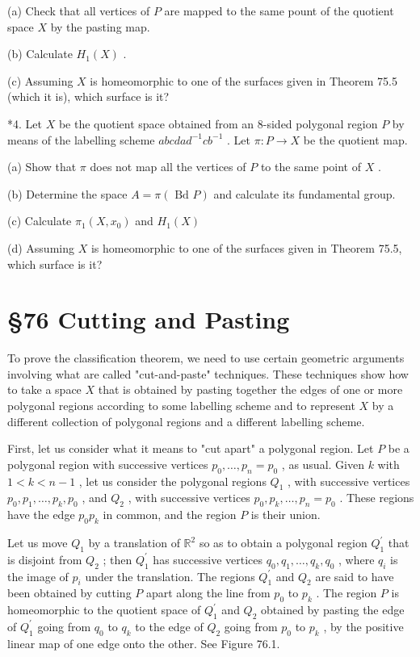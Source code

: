 (a) Check that all vertices of \(P\) are mapped to the same pount of the quotient space \(X\) by the pasting map.

(b) Calculate \({H}_{1}\left( X\right)\) .

(c) Assuming \(X\) is homeomorphic to one of the surfaces given in Theorem 75.5 (which it is), which surface is it?

*4. Let \(X\) be the quotient space obtained from an 8-sided polygonal region \(P\) by means of the labelling scheme \({abcda}{d}^{-1}c{b}^{-1}\) . Let \(\pi  : P \rightarrow  X\) be the quotient map.

(a) Show that \(\pi\) does not map all the vertices of \(P\) to the same point of \(X\) .

(b) Determine the space \(A = \pi \left( {\text{ Bd }P}\right)\) and calculate its fundamental group.

(c) Calculate \({\pi }_{1}\left( {X,{x}_{0}}\right)\) and \({H}_{1}\left( X\right)\)

(d) Assuming \(X\) is homeomorphic to one of the surfaces given in Theorem 75.5, which surface is it?

\section*{ \S 76 Cutting and Pasting}

To prove the classification theorem, we need to use certain geometric arguments involving what are called "cut-and-paste" techniques. These techniques show how to take a space \(X\) that is obtained by pasting together the edges of one or more polygonal regions according to some labelling scheme and to represent \(X\) by a different collection of polygonal regions and a different labelling scheme.

First, let us consider what it means to "cut apart" a polygonal region. Let \(P\) be a polygonal region with successive vertices \({p}_{0},\ldots ,{p}_{n} = {p}_{0}\) , as usual. Given \(k\) with \(1 < k < n - 1\) , let us consider the polygonal regions \({Q}_{1}\) , with successive vertices \({p}_{0},{p}_{1},\ldots ,{p}_{k},{p}_{0}\) , and \({Q}_{2}\) , with successive vertices \({p}_{0},{p}_{k},\ldots ,{p}_{n} = {p}_{0}\) . These regions have the edge \({p}_{0}{p}_{k}\) in common, and the region \(P\) is their union.

Let us move \({Q}_{1}\) by a translation of \({\mathbb{R}}^{2}\) so as to obtain a polygonal region \({Q}_{1}^{\prime }\) that is disjoint from \({Q}_{2}\) ; then \({Q}_{1}^{\prime }\) has successive vertices \({q}_{0},{q}_{1},\ldots ,{q}_{k},{q}_{0}\) , where \({q}_{i}\) is the image of \({p}_{i}\) under the translation. The regions \({Q}_{1}^{\prime }\) and \({Q}_{2}\) are said to have been obtained by cutting \(P\) apart along the line from \({p}_{0}\) to \({p}_{k}\) . The region \(P\) is homeomorphic to the quotient space of \({Q}_{1}^{\prime }\) and \({Q}_{2}\) obtained by pasting the edge of \({Q}_{1}^{\prime }\) going from \({q}_{0}\) to \({q}_{k}\) to the edge of \({Q}_{2}\) going from \({p}_{0}\) to \({p}_{k}\) , by the positive linear map of one edge onto the other. See Figure 76.1.

